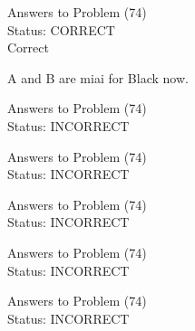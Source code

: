 \documentclass[11pt]{article}
\begin{document}
\begin{minipage}[t]{0.5\textwidth}
  {\centering
  
  Answers to Problem (74)\\
  Status: CORRECT\\
  Correct

A and B are miai for Black now.\\
  }
\end{minipage}
\begin{minipage}[t]{0.5\textwidth}
  {\centering
  
  Answers to Problem (74)\\
  Status: INCORRECT\\
  
  }
\end{minipage}
\begin{minipage}[t]{0.5\textwidth}
  {\centering
  
  Answers to Problem (74)\\
  Status: INCORRECT\\
  
  }
\end{minipage}
\begin{minipage}[t]{0.5\textwidth}
  {\centering
  
  Answers to Problem (74)\\
  Status: INCORRECT\\
  
  }
\end{minipage}
\begin{minipage}[t]{0.5\textwidth}
  {\centering
  
  Answers to Problem (74)\\
  Status: INCORRECT\\
  
  }
\end{minipage}
\begin{minipage}[t]{0.5\textwidth}
  {\centering
  
  Answers to Problem (74)\\
  Status: INCORRECT\\
  
  }
\end{minipage}
\end{document}
